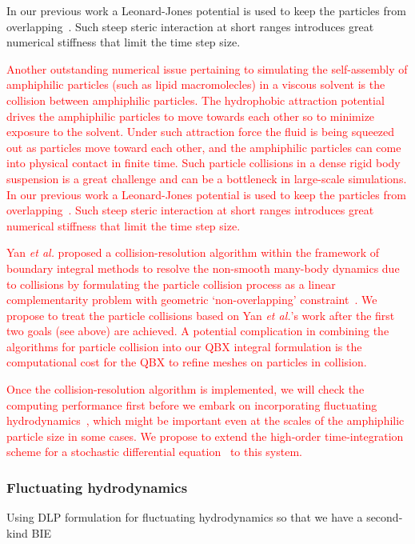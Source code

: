 In our previous work a
Leonard-Jones potential is used to keep the particles from
overlapping~\cite{Fu2018_SIAM}. Such steep steric interaction at short
ranges introduces great numerical stiffness that limit the time step
size. 
\cite{bys-sha-qua2020}


\textcolor{red}{
Another outstanding numerical issue pertaining to simulating the
self-assembly of amphiphilic particles (such as lipid macromolecles) in
a viscous solvent is the collision between amphiphilic particles. The
hydrophobic attraction potential drives the amphiphilic particles to
move towards each other so to minimize exposure to the solvent. Under
such attraction force the fluid is being squeezed out as particles move
toward each other, and the amphiphilic particles can come into physical
contact in finite time. Such particle collisions in a dense rigid body
suspension is a great challenge and can be a bottleneck in large-scale
simulations. In our previous work a Leonard-Jones potential is used to
keep the particles from overlapping~\cite{Fu2018_SIAM}. Such steep
steric interaction at short ranges introduces great numerical stiffness
that limit the time step size. 
}

\textcolor{red}{
Yan {\it et al.} proposed a collision-resolution algorithm within the
framework of boundary integral methods to resolve the non-smooth
many-body dynamics due to collisions by formulating the particle
collision process as a linear complementarity problem with geometric
`non-overlapping' constraint~\cite{Yan2019}. We propose to treat the
particle collisions based on Yan {\it et al.}'s work after the first two
goals (see above) are achieved. A potential complication in combining
the algorithms for particle collision into our QBX integral formulation
is the computational cost for the QBX to refine meshes on particles in
collision.
}

\textcolor{red}{
Once the collision-resolution algorithm is implemented, we will check
the computing performance first before we embark on incorporating
fluctuating hydrodynamics~\cite{Bao17,Bao18}, which might be important
even at the scales of the amphiphilic particle size in some cases. We
propose to extend the high-order time-integration scheme for a
stochastic differential equation~\cite{fu2015pre} to this system.
}


\subsubsection{Fluctuating hydrodynamics}
\label{subsec:fluctuating}
Using DLP formulation for fluctuating hydrodynamics so that we have a
second-kind BIE



